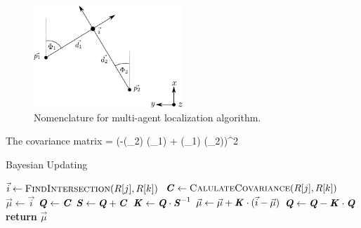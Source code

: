 \begin{figure}[ht]
	\centering
		\includegraphics[width=0.50\textwidth]{figures/rays}
    \caption[Nomenclature for multi-agent localization algorithm]
            {Nomenclature for multi-agent localization algorithm.}
    \label{fig:03_rays}
\end{figure}

The covariance matrix 
\bal
{} = 
                                  {(-\cos(\Phi_2) \cdot \sin(\Phi_1) + \cos(\Phi_1) \cdot \sin(\Phi_2))^2}
\eal



\begin{algorithm}[H]
    \caption{Bayesian Updating}\label{alg:03_multiAgentLoca}
    \begin{algorithmic}[1]
                    \State $\vec{i} \gets \Call{FindIntersection}{R[j], R[k]}$
                    \State $\textbf{\textit{C}} \gets \Call{CalulateCovariance}{R[j], R[k]}$
                        \State $\vec{\mu} \gets \vec{i}$
                        \State $\textbf{\textit{Q}} \gets \textbf{\textit{C}}$
                        \State $\textbf{\textit{S}} \gets \textbf{\textit{Q}} + \textbf{\textit{C}}$
                        \State $\textbf{\textit{K}} \gets \textbf{\textit{Q}} \cdot \textbf{\textit{S}}^{-1}$
                        \State $\vec{\mu} \gets \vec{\mu} + \textbf{\textit{K}} \cdot (\vec{i} - \vec{\mu})$
                        \State $\textbf{\textit{Q}} \gets \textbf{\textit{Q}} - \textbf{\textit{K}} \cdot \textbf{\textit{Q}}$
                    \EndIf
                \EndFor
            \EndFor
            \State \textbf{return} $\vec{\mu}$
        \EndProcedure\vspace{12pt}
    \end{algorithmic}
\end{algorithm}


